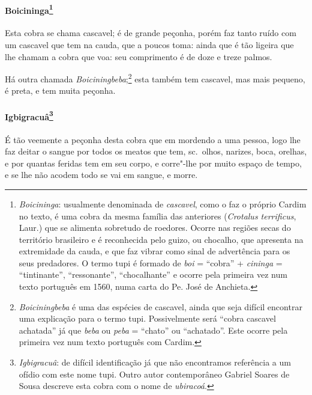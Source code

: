 \paragraph{Boicininga\footnote{ \textit{Boicininga}: usualmente
denominada de \textit{cascavel}, como o faz o próprio Cardim no texto,
é uma cobra da mesma família das anteriores (\textit{Crotalus
terrificus}, Laur.) que se alimenta sobretudo de roedores. Ocorre nas
regiões secas do território brasileiro e é reconhecida pelo guizo, ou
chocalho, que apresenta na extremidade da cauda, e que faz vibrar como
sinal de advertência para os seus predadores. O termo tupi é formado
de \textit{boi} = ``cobra'' + \textit{cininga} = ``tintinante'',
``ressonante'', ``chocalhante'' e ocorre pela primeira vez num texto
português em 1560, numa carta do Pe. José de
Anchieta.}} Esta cobra se chama cascavel; é de grande peçonha,
porém faz tanto ruído com um cascavel que tem na cauda, que a poucos
toma: ainda que é tão ligeira que lhe chamam a cobra que voa: seu
comprimento é de doze e treze palmos.

 Há outra chamada \textit{Boiciningbeba};\footnote{ \textit{Boiciningbeba} 
é uma das espécies de cascavel, ainda que seja
difícil encontrar uma explicação para o termo tupi. Possivelmente será
``cobra cascavel achatada'' já que \textit{beba} ou \textit{peba} =
``chato'' ou ``achatado''. Este ocorre pela primeira vez num texto
português com Cardim.} esta também tem cascavel, mas mais pequeno, é
preta, e tem muita peçonha.

\paragraph{Igbigracuâ\footnote{ \textit{Igbigracuâ}: de difícil
identificação já que não encontramos referência a um ofídio com este
nome tupi. Outro autor contemporâneo Gabriel Soares de Sousa descreve
esta cobra com o nome de \textit{ubiracoá}.}} É tão veemente
a peçonha desta cobra que em mordendo a uma pessoa, logo lhe faz deitar
o sangue por todos os meatos que tem, sc.~olhos, narizes, boca,
orelhas, e por quantas feridas tem em seu corpo, e corre"-lhe por muito
espaço de tempo, e se lhe não acodem todo se vai em sangue, e morre.

